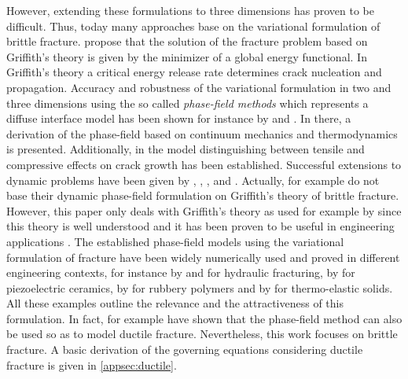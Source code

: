 However, extending these formulations to three dimensions has proven to be difficult. Thus, today many approaches base on the variational formulation of brittle fracture. \citet{02_B_VarBrittle} propose that the solution of the fracture problem based on Griffith's theory is given by the minimizer of a global energy functional. In Griffith's theory a critical energy release rate determines crack nucleation and propagation. Accuracy and robustness of the variational formulation in two and three dimensions using the so called \textit{phase-field methods} which represents a diffuse interface model has been shown for instance by \citet{04_B_VarBrittleProve2} and \citet{03_B_VarBrittleProve1}. In there, a derivation of the phase-field based on continuum mechanics and thermodynamics is presented. Additionally, in \cite{04_B_VarBrittleProve2} the model distinguishing between tensile and compressive effects on crack growth has been established. Successful extensions to dynamic problems have been given by \citet{01_PF_dyn_brittle}, \citet{05_B_dynExtension1}, \citet{06_B_dynExtension2}, \citet{07_B_dynExtension3} and \citet{08_B_dynExtension4}. Actually, for example \citet{10_PH_Mode3} do not base their dynamic phase-field formulation on Griffith's theory of brittle fracture. However, this paper only deals with Griffith's theory as used for example by \citet{08_PF_Gammac2} since this theory is well understood and it has been proven to be useful in engineering applications \citep{01_PF_dyn_brittle}. The established phase-field models using the variational formulation of fracture have been widely numerically used and proved in different engineering contexts, for instance by \citet{11_B_EngProb1} and \citet{12_B_EngProb2} for hydraulic fracturing, by \citet{13_B_EngProb3} for piezoelectric ceramics, by \citet{14_B_EngProb4} for rubbery polymers and by \citet{15_B_EngProb5} for thermo-elastic solids. All these examples outline the relevance and the attractiveness of this formulation. In fact, for example \citet{03_PF_ductile} have shown that the phase-field method can also be used so as to model ductile fracture. Nevertheless, this work focuses on brittle fracture. A basic derivation of the governing equations considering ductile fracture is given in \ref{appsec:ductile}.

